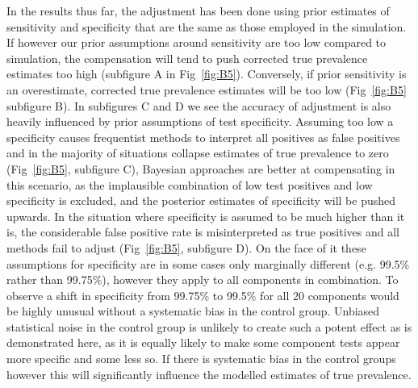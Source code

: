 \documentclass[a4paper, 12pt, twoside]{article}
\begin{document}
In the results thus far, the adjustment has been done using prior estimates of sensitivity and specificity that are the same as those employed in the simulation. If however our prior assumptions around sensitivity are too low compared to simulation, the compensation will tend to push corrected true prevalence estimates too high (subfigure A in Fig~\ref{fig:B5}). Conversely, if prior sensitivity is an overestimate, corrected true prevalence estimates will be too low (Fig~\ref{fig:B5} subfigure B). In subfigures C and D we see the accuracy of adjustment is also heavily influenced by prior assumptions of test specificity. Assuming too low a specificity causes frequentist methods to interpret all positives as false positives and in the majority of situations collapse estimates of true prevalence to zero (Fig~\ref{fig:B5}, subfigure C), Bayesian approaches are better at compensating in this scenario, as the implausible combination of low test positives and low specificity is excluded, and the posterior estimates of specificity will be pushed upwards. In the situation where specificity is assumed to be much higher than it is, the considerable false positive rate is misinterpreted as true positives and all methods fail to adjust (Fig~\ref{fig:B5}, subfigure D). On the face of it these assumptions for specificity are in some cases only marginally different (e.g. 99.5\% rather than 99.75\%), however they apply to all components in combination. To observe a shift in specificity from 99.75\% to 99.5\% for all 20 components would be highly unusual without a systematic bias in the control group. Unbiased statistical noise in the control group is unlikely to create such a potent effect as is demonstrated here, as it is equally likely to make some component tests appear more specific and some less so. If there is systematic bias in the control groups however this will significantly influence the modelled estimates of true prevalence.
\end{document}
